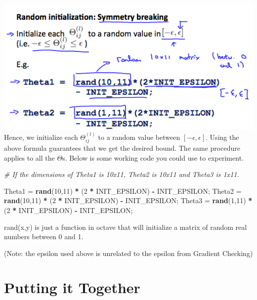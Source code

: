 \documentclass[
]{book}
\newenvironment{Shaded}{\begin{snugshade}}{\end{snugshade}}
\newcommand{\CommentTok}[1]{\textcolor[rgb]{0.56,0.35,0.01}{\textit{#1}}}
\newcommand{\DecValTok}[1]{\textcolor[rgb]{0.00,0.00,0.81}{#1}}
\newcommand{\KeywordTok}[1]{\textcolor[rgb]{0.13,0.29,0.53}{\textbf{#1}}}
\newcommand{\NormalTok}[1]{#1}
\newcommand{\OperatorTok}[1]{\textcolor[rgb]{0.81,0.36,0.00}{\textbf{#1}}}
\newcommand{\StringTok}[1]{\textcolor[rgb]{0.31,0.60,0.02}{#1}}
\begin{document}
\includegraphics{symmetryBreaking.png}
Hence, we initialize each \(\Theta^{(l)}_{ij}\) to a random value between \([-\epsilon,\epsilon]\). Using the above formula guarantees that we get the desired bound. The same procedure applies to all the \(\Theta\)s. Below is some working code you could use to experiment.

\begin{Shaded}
\begin{Highlighting}[]
\CommentTok{# If the dimensions of Theta1 is 10x11, Theta2 is 10x11 and Theta3 is 1x11.}

\NormalTok{Theta1 =}\StringTok{ }\KeywordTok{rand}\NormalTok{(}\DecValTok{10}\NormalTok{,}\DecValTok{11}\NormalTok{) }\OperatorTok{*}\StringTok{ }\NormalTok{(}\DecValTok{2} \OperatorTok{*}\StringTok{ }\NormalTok{INIT_EPSILON) }\OperatorTok{-}\StringTok{ }\NormalTok{INIT_EPSILON;}
\NormalTok{Theta2 =}\StringTok{ }\KeywordTok{rand}\NormalTok{(}\DecValTok{10}\NormalTok{,}\DecValTok{11}\NormalTok{) }\OperatorTok{*}\StringTok{ }\NormalTok{(}\DecValTok{2} \OperatorTok{*}\StringTok{ }\NormalTok{INIT_EPSILON) }\OperatorTok{-}\StringTok{ }\NormalTok{INIT_EPSILON;}
\NormalTok{Theta3 =}\StringTok{ }\KeywordTok{rand}\NormalTok{(}\DecValTok{1}\NormalTok{,}\DecValTok{11}\NormalTok{) }\OperatorTok{*}\StringTok{ }\NormalTok{(}\DecValTok{2} \OperatorTok{*}\StringTok{ }\NormalTok{INIT_EPSILON) }\OperatorTok{-}\StringTok{ }\NormalTok{INIT_EPSILON;}
\end{Highlighting}
\end{Shaded}

rand(x,y) is just a function in octave that will initialize a matrix of random real numbers between 0 and 1.

(Note: the epsilon used above is unrelated to the epsilon from Gradient Checking)

\hypertarget{putting-it-together}{%
\section{Putting it Together}\label{putting-it-together}}
\end{document}
